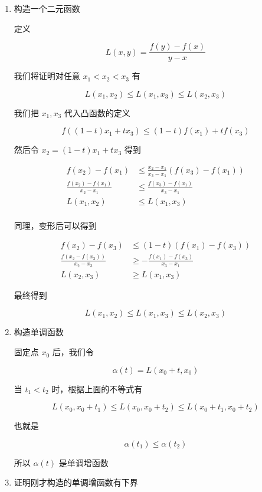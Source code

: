 \documentclass[12pt,a4paper]{ctexart}
\begin{document}
\begin{enumerate}
    \item 构造一个二元函数

    定义 

    \[
        L(x,y)= \frac{f(y) - f(x)}{y-x}
    \]

    我们将证明对任意 $x_1 < x_2 < x_3$  有

    \[
        L(x_1, x_2) \le L(x_1,x_3) \le L(x_2, x_3)
    \]

    我们把 $x_1, x_3$ 代入凸函数的定义

    \[
    f((1-t)x_1 + tx_3) \le (1-t)f(x_1) + tf(x_3)
    \]

    然后令 $x_2 = (1-t)x_1 + tx_3$ 得到

    \begin{align*}
        f(x_2) - f(x_1) & \le \frac{x_2 - x_1}{x_3 - x_1}\left(f(x_3) - f(x_1)\right) \\
        \frac{f(x_2) - f(x_1)}{x_2 - x_1} & \le \frac{f(x_3) - f(x_1)}{x_3 - x_1} \\
        L(x_1, x_2) &\le L(x_1, x_3) \\
    \end{align*}

    同理，变形后可以得到

    \begin{align*}
        f(x_2) - f(x_3) &\le (1-t)(f(x_1) - f(x_3)) \\   
        \frac{f(x_2 - f(x_3))}{x_2 - x_3} & \ge - \frac{f(x_1) -f(x_3)}{x_3 - x_1} \\
        L(x_2, x_3) & \ge L(x_1, x_3) 
    \end{align*}

    最终得到

    \[
        L(x_1, x_2) \le L(x_1, x_3) \le L(x_2, x_3)
    \]

\item 构造单调函数

固定点 $x_0$ 后，我们令 

\[
\alpha(t) = L(x_0 + t, x_0)
\]

当 $t_1 < t_2$ 时，根据上面的不等式有

\[
L(x_0, x_0 + t_1) \le L(x_0,x_0 + t_2) \le L(x_0 + t_1, x_0 + t_2)
\]

也就是

\[
\alpha(t_1) \le \alpha(t_2)
\]

所以 $\alpha(t)$ 是单调增函数

\item 证明刚才构造的单调增函数有下界


\end{enumerate}
\end{document}
